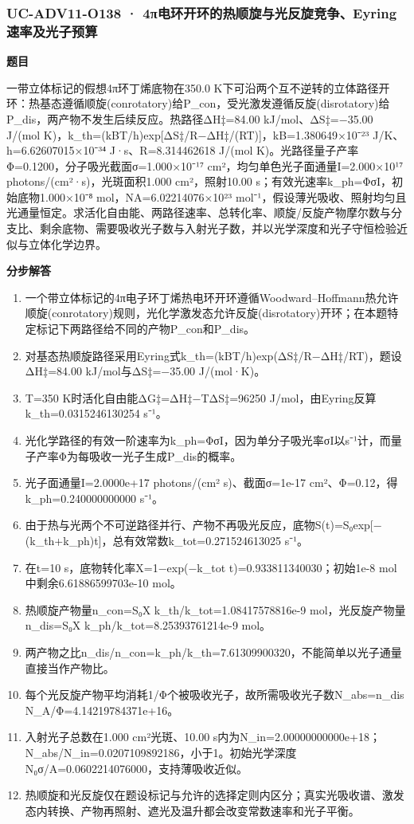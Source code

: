 \documentclass[UTF8,11pt,a4paper]{ctexart}
\begin{document}
\subsubsection*{UC-ADV11-O138 · 4π电环开环的热顺旋与光反旋竞争、Eyring速率及光子预算}
\noindent\textbf{题目}\par
一带立体标记的假想4π环丁烯底物在350.0 K下可沿两个互不逆转的立体路径开环：热基态遵循顺旋(conrotatory)给P\_con，受光激发遵循反旋(disrotatory)给P\_dis，两产物不发生后续反应。热路径ΔH‡=84.00 kJ/mol、ΔS‡=−35.00 J/(mol K)，k\_th=(kBT/h)exp[ΔS‡/R−ΔH‡/(RT)]，kB=1.380649×10⁻²³ J/K、h=6.62607015×10⁻³⁴ J·s、R=8.314462618 J/(mol K)。光路径量子产率Φ=0.1200，分子吸光截面σ=1.000×10⁻¹⁷ cm²，均匀单色光子面通量I=2.000×10¹⁷ photons/(cm²·s)，光斑面积1.000 cm²，照射10.00 s；有效光速率k\_ph=ΦσI，初始底物1.000×10⁻⁸ mol，NA=6.02214076×10²³ mol⁻¹，假设薄光吸收、照射均匀且光通量恒定。求活化自由能、两路径速率、总转化率、顺旋/反旋产物摩尔数与分支比、剩余底物、需要吸收光子数与入射光子数，并以光学深度和光子守恒检验近似与立体化学边界。\par
\medskip\noindent\textbf{分步解答}
\begin{enumerate}
\item 一个带立体标记的4π电子环丁烯热电环开环遵循Woodward–Hoffmann热允许顺旋(conrotatory)规则，光化学激发态允许反旋(disrotatory)开环；在本题特定标记下两路径给不同的产物P\_con和P\_dis。
\item 对基态热顺旋路径采用Eyring式k\_th=(kBT/h)exp(ΔS‡/R−ΔH‡/RT)，题设ΔH‡=84.00 kJ/mol与ΔS‡=−35.00 J/(mol·K)。
\item T=350 K时活化自由能ΔG‡=ΔH‡−TΔS‡=96250 J/mol，由Eyring反算k\_th=0.0315246130254 s⁻¹。
\item 光化学路径的有效一阶速率为k\_ph=ΦσI，因为单分子吸光率σI以s⁻¹计，而量子产率Φ为每吸收一光子生成P\_dis的概率。
\item 光子面通量I=2.0000e+17 photons/(cm² s)、截面σ=1e-17 cm²、Φ=0.12，得k\_ph=0.240000000000 s⁻¹。
\item 由于热与光两个不可逆路径并行、产物不再吸光反应，底物S(t)=S₀exp[−(k\_th+k\_ph)t]，总有效常数k\_tot=0.271524613025 s⁻¹。
\item 在t=10 s，底物转化率X=1−exp(−k\_tot t)=0.933811340030；初始1e-8 mol中剩余6.61886599703e-10 mol。
\item 热顺旋产物量n\_con=S₀X k\_th/k\_tot=1.08417578816e-9 mol，光反旋产物量n\_dis=S₀X k\_ph/k\_tot=8.25393761214e-9 mol。
\item 两产物之比n\_dis/n\_con=k\_ph/k\_th=7.61309900320，不能简单以光子通量直接当作产物比。
\item 每个光反旋产物平均消耗1/Φ个被吸收光子，故所需吸收光子数N\_abs=n\_dis N\_A/Φ=4.14219784371e+16。
\item 入射光子总数在1.000 cm²光斑、10.00 s内为N\_in=2.00000000000e+18；N\_abs/N\_in=0.0207109892186，小于1。初始光学深度N₀σ/A=0.0602214076000，支持薄吸收近似。
\item 热顺旋和光反旋仅在题设标记与允许的选择定则内区分；真实光吸收谱、激发态内转换、产物再照射、遮光及温升都会改变常数速率和光子平衡。
\end{enumerate}
\end{document}

